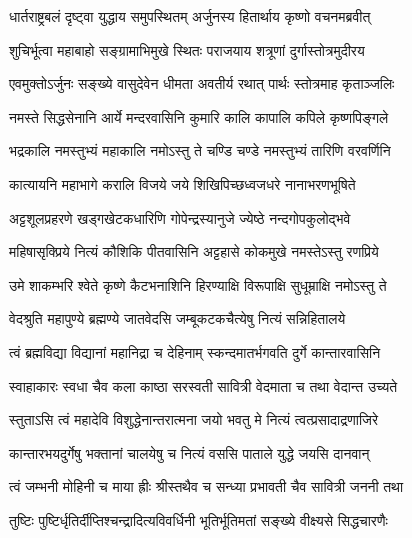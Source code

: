 


\twolineshloka
{धार्तराष्ट्रबलं दृष्ट्वा युद्धाय समुपस्थितम्}
{अर्जुनस्य हितार्थाय कृष्णो वचनमब्रवीत्}


\twolineshloka
{शुचिर्भूत्वा महाबाहो सङ्ग्रामाभिमुखे स्थितः}
{पराजयाय शत्रूणां दुर्गास्तोत्रमुदीरय}


\twolineshloka
{एवमुक्तोऽर्जुनः सङ्ख्ये वासुदेवेन धीमता}
{अवतीर्य रथात् पार्थः स्तोत्रमाह कृताञ्जलिः}


\twolineshloka
{नमस्ते सिद्धसेनानि आर्ये मन्दरवासिनि}
{कुमारि कालि कापालि कपिले कृष्णपिङ्गले}

\twolineshloka
{भद्रकालि नमस्तुभ्यं महाकालि नमोऽस्तु ते}
{चण्डि चण्डे नमस्तुभ्यं तारिणि वरवर्णिनि}

\twolineshloka
{कात्यायनि महाभागे करालि विजये जये}
{शिखिपिच्छध्वजधरे नानाभरणभूषिते}

\twolineshloka
{अट्टशूलप्रहरणे खड्गखेटकधारिणि}
{गोपेन्द्रस्यानुजे ज्येष्ठे नन्दगोपकुलोद्भवे}

\twolineshloka
{महिषासृक्प्रिये नित्यं कौशिकि पीतवासिनि}
{अट्टहासे कोकमुखे नमस्तेऽस्तु रणप्रिये}

\twolineshloka
{उमे शाकम्भरि श्वेते कृष्णे कैटभनाशिनि}
{हिरण्याक्षि विरूपाक्षि सुधूम्राक्षि नमोऽस्तु ते}

\twolineshloka
{वेदश्रुति महापुण्ये ब्रह्मण्ये जातवेदसि}
{जम्बूकटकचैत्येषु नित्यं सन्निहितालये}

\twolineshloka
{त्वं ब्रह्मविद्या विद्यानां महानिद्रा च देहिनाम्}
{स्कन्दमातर्भगवति दुर्गे कान्तारवासिनि}

\twolineshloka
{स्वाहाकारः स्वधा चैव कला काष्ठा सरस्वती}
{सावित्री वेदमाता च तथा वेदान्त उच्यते}

\twolineshloka
{स्तुताऽसि त्वं महादेवि विशुद्धेनान्तरात्मना}
{जयो भवतु मे नित्यं त्वत्प्रसादाद्रणाजिरे}

\twolineshloka
{कान्तारभयदुर्गेषु भक्तानां चालयेषु च}
{नित्यं वससि पाताले युद्धे जयसि दानवान्}

\twolineshloka
{त्वं जम्भनी मोहिनी च माया ह्रीः श्रीस्तथैव च}
{सन्ध्या प्रभावती चैव सावित्री जननी तथा}

\twolineshloka
{तुष्टिः पुष्टिर्धृतिर्दीप्तिश्चन्द्रादित्यविवर्धिनी}
{भूतिर्भूतिमतां सङ्ख्ये वीक्ष्यसे सिद्धचारणैः}

